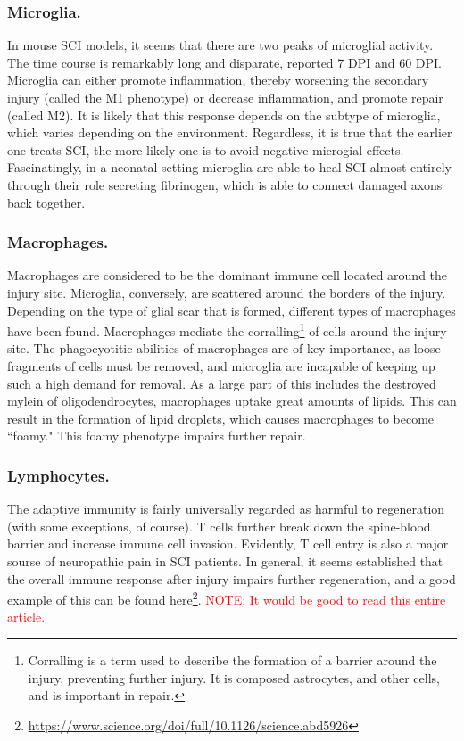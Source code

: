 \documentclass[12pt]{report}
\begin{document}
\subsubsection{Microglia.}
In mouse SCI models, it seems that there are two peaks of microglial activity. The time course is remarkably long and disparate, reported 7 DPI and 60 DPI. Microglia can either promote inflammation, thereby worsening the secondary injury (called the M1 phenotype) or decrease inflammation, and promote repair (called M2). It is likely that this response depends on the subtype of microglia, which varies depending on the environment. Regardless, it is true that the earlier one treats SCI, the more likely one is to avoid negative microgial effects. Fascinatingly, in a neonatal setting microglia are able to heal SCI almost entirely through their role secreting fibrinogen, which is able to connect damaged axons back together. 

\subsubsection{Macrophages.}
Macrophages are considered to be the dominant immune cell located around the injury site. Microglia, conversely, are scattered around the borders of the injury. Depending on the type of glial scar that is formed, different types of macrophages have been found. Macrophages mediate the corralling\footnote{Corralling is a term used to describe the formation of a barrier around the injury, preventing further injury. It is composed astrocytes, and other cells, and is important in repair.} of cells around the injury site. The phagocyotitic abilities of macrophages are of key importance, as loose fragments of cells must be removed, and microglia are incapable of keeping up such a high demand for removal. As a large part of this includes the destroyed mylein of oligodendrocytes, macrophages uptake great amounts of lipids. This can result in the formation of lipid droplets, which causes macrophages to become ``foamy." This foamy phenotype impairs further repair. 

\subsubsection{Lymphocytes.} 
The adaptive immunity is fairly universally regarded as harmful to regeneration (with some exceptions, of course). T cells further break down the spine-blood barrier and increase immune cell invasion. Evidently, T cell entry is also a major sourse of neuropathic pain in SCI patients. In general, it seems established that the overall immune response after injury impairs further regeneration, and a good example of this can be found here\footnote{\url{https://www.science.org/doi/full/10.1126/science.abd5926}}. \textcolor{red}{NOTE: It would be good to read this entire article.}
\end{document}
